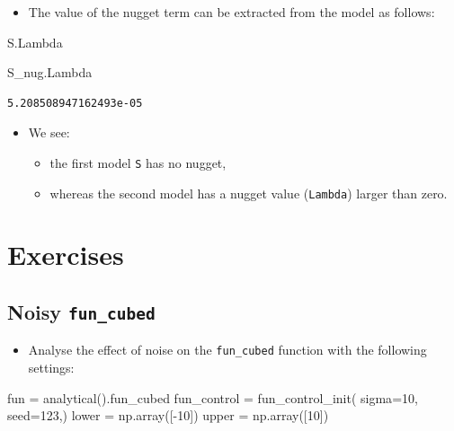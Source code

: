 \documentclass[
  letterpaper,
  DIV=11,
  numbers=noendperiod]{scrreprt}
\newenvironment{Shaded}{\begin{snugshade}}{\end{snugshade}}
\newcommand{\DecValTok}[1]{\textcolor[rgb]{0.68,0.00,0.00}{#1}}
\newcommand{\NormalTok}[1]{\textcolor[rgb]{0.00,0.23,0.31}{#1}}
\newcommand{\OperatorTok}[1]{\textcolor[rgb]{0.37,0.37,0.37}{#1}}
\providecommand{\tightlist}{%
  \setlength{\itemsep}{0pt}\setlength{\parskip}{0pt}}\usepackage{longtable,booktabs,array}
\begin{document}
\begin{itemize}
\tightlist
\item
  The value of the nugget term can be extracted from the model as
  follows:
\end{itemize}

\begin{Shaded}
\begin{Highlighting}[]
\NormalTok{S.Lambda}
\end{Highlighting}
\end{Shaded}

\begin{Shaded}
\begin{Highlighting}[]
\NormalTok{S\_nug.Lambda}
\end{Highlighting}
\end{Shaded}

\begin{verbatim}
5.208508947162493e-05
\end{verbatim}

\begin{itemize}
\tightlist
\item
  We see:

  \begin{itemize}
  \tightlist
  \item
    the first model \texttt{S} has no nugget,
  \item
    whereas the second model has a nugget value (\texttt{Lambda}) larger
    than zero.
  \end{itemize}
\end{itemize}

\hypertarget{exercises-6}{%
\section{Exercises}\label{exercises-6}}

\hypertarget{noisy-fun_cubed}{%
\subsection{\texorpdfstring{Noisy
\texttt{fun\_cubed}}{Noisy fun\_cubed}}\label{noisy-fun_cubed}}

\begin{itemize}
\tightlist
\item
  Analyse the effect of noise on the \texttt{fun\_cubed} function with
  the following settings:
\end{itemize}

\begin{Shaded}
\begin{Highlighting}[]
\NormalTok{fun }\OperatorTok{=}\NormalTok{ analytical().fun\_cubed}
\NormalTok{fun\_control }\OperatorTok{=}\NormalTok{ fun\_control\_init(}
\NormalTok{    sigma}\OperatorTok{=}\DecValTok{10}\NormalTok{,}
\NormalTok{    seed}\OperatorTok{=}\DecValTok{123}\NormalTok{,)}
\NormalTok{lower }\OperatorTok{=}\NormalTok{ np.array([}\OperatorTok{{-}}\DecValTok{10}\NormalTok{])}
\NormalTok{upper }\OperatorTok{=}\NormalTok{ np.array([}\DecValTok{10}\NormalTok{])}
\end{Highlighting}
\end{Shaded}
\end{document}
